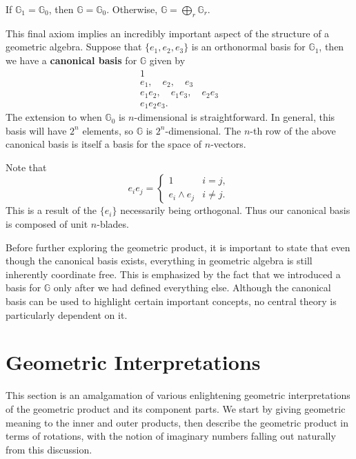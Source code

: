 \documentclass[twoside,10pt]{article}
\begin{document}
\begin{axiom}
	If $\mathbb{G}_1 = \mathbb{G}_0$, then $\mathbb{G} = \mathbb{G}_{0}$. Otherwise, $\mathbb{G} = \bigoplus_{r}\mathbb{G}_{r}$.
\end{axiom}

This final axiom implies an incredibly important aspect of the structure of a geometric algebra. Suppose that $\{ e_1, e_2, e_3 \}$ is an orthonormal basis for $\mathbb{G}_{1}$, then we have a \textbf{canonical basis} for $\mathbb{G}$ given by
\[
	\begin{gathered}
	1 \\
	e_1, \quad e_2,\quad e_3 \\
	e_1e_2, \quad e_1e_3,\quad e_2e_3 \\
	e_1e_2e_3.
	\end{gathered}
\]
The extension to when $\mathbb{G}_{0}$ is $n$-dimensional is straightforward. In general, this basis will have $2^{n}$ elements, so $\mathbb{G}$ is $2^{n}$-dimensional. The $n$-th row of the above canonical basis is itself a basis for the space of $n$-vectors.

Note that
\[
e_i e_j =
\begin{cases}
	1 & i=j, \\
	e_i \wedge e_j & i \neq j.
\end{cases}
\]
This is a result of the $\{e_i\}$ necessarily being orthogonal. Thus our canonical basis is composed of unit $n$-blades.

Before further exploring the geometric product, it is important to state that even though the canonical basis exists, everything in geometric algebra is still inherently coordinate free. This is emphasized by the fact that we introduced a basis for $\mathbb{G}$ only after we had defined everything else. Although the canonical basis can be used to highlight certain important concepts, no central theory is particularly dependent on it.

\section{Geometric Interpretations}

This section is an amalgamation of various enlightening geometric interpretations of the geometric product and its component parts. We start by giving geometric meaning to the inner and outer products, then describe the geometric product in terms of rotations, with the notion of imaginary numbers falling out naturally from this discussion.
\end{document}
